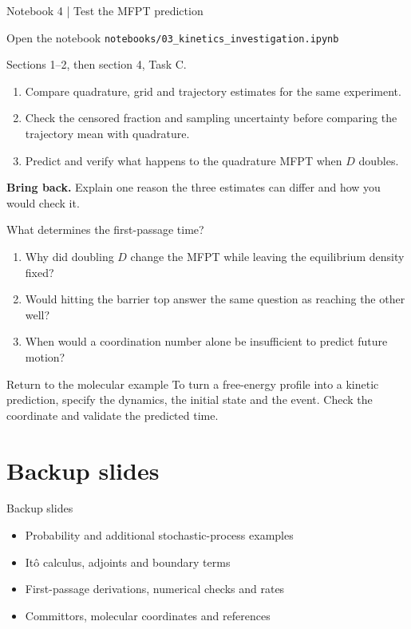 \documentclass[aspectratio=169,10pt]{beamer}
\begin{document}
\begin{frame}{Notebook 4 | Test the MFPT prediction}
\begin{block}{Open the notebook}
\texttt{notebooks/03\_kinetics\_investigation.ipynb}\par
Sections 1--2, then section 4, Task C.
\end{block}
\begin{enumerate}
\item Compare quadrature, grid and trajectory estimates for the same experiment.
\item Check the censored fraction and sampling uncertainty before comparing the trajectory mean with quadrature.
\item Predict and verify what happens to the quadrature MFPT when $D$ doubles.
\end{enumerate}
\textbf{Bring back.} Explain one reason the three estimates can differ and how you would check it.
\end{frame}

\begin{frame}{What determines the first-passage time?}
\begin{enumerate}
\item Why did doubling $D$ change the MFPT while leaving the equilibrium density fixed?
\item Would hitting the barrier top answer the same question as reaching the other well?
\item When would a coordination number alone be insufficient to predict future motion?
\end{enumerate}
\begin{block}{Return to the molecular example}
To turn a free-energy profile into a kinetic prediction, specify the dynamics, the initial state and the event. Check the coordinate and validate the predicted time.
\end{block}
\end{frame}

\appendix
\section{Backup slides}
\setcounter{framenumber}{0}
\renewcommand{\snsfooterprefix}{Backup\enspace B}

\begin{frame}{Backup slides}
\begin{itemize}
\item Probability and additional stochastic-process examples
\item It\^o calculus, adjoints and boundary terms
\item First-passage derivations, numerical checks and rates
\item Committors, molecular coordinates and references
\end{itemize}
\end{frame}
\end{document}
